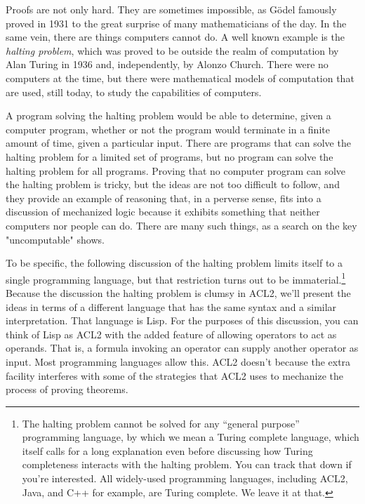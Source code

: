 Proofs are not only hard.
They are sometimes impossible, as G\"odel famously proved in 1931
to the great surprise of many mathematicians of the day.
In the same vein, there are things computers cannot do.
A well known example is the \emph{halting problem}, which
was proved to be outside the realm of computation
by Alan Turing in 1936
and, independently, by Alonzo Church.
There were no computers at the time,
but there were mathematical models of computation
that are used, still today, to study the capabilities of computers.

A program solving the
halting problem would be able to determine,
given a computer program, whether or not the program would terminate
in a finite amount of time, given a particular input.
There are programs that can solve the halting problem for
a limited set of programs,
but no program can solve the halting problem for all programs.
Proving that no computer program can solve the halting problem is tricky,
but the ideas are not too difficult to follow, and
they provide an example of reasoning that,
in a perverse sense, fits into a discussion of mechanized logic
because it exhibits something that neither computers
nor people can do. There are many such things, as a search
on the key "uncomputable" shows.

To be specific, the following discussion of the halting problem
limits itself to a single programming language, but
that restriction turns out to be immaterial.\footnote{The
halting problem cannot be solved
for any ``general purpose'' programming language,
by which we mean a Turing complete language,
which itself calls for a long explanation even
before discussing how Turing completeness
interacts with the halting problem.
You can track that down if you're interested.
All widely-used programming languages,
including ACL2, Java, and C++ for example, are Turing complete.
We leave it at that.}
Because the discussion the halting problem is clumsy in ACL2,
we'll present the ideas in terms of a different
language that has the same syntax
and a similar interpretation. That language is Lisp.
For the purposes of this discussion,
you can think of Lisp as ACL2 with the added feature
of allowing operators to act as operands.
That is, a formula invoking an operator can supply
another operator as input.
Most programming languages allow this.
ACL2 doesn't because the extra facility
interferes with some of the strategies that ACL2 uses
to mechanize the process of proving theorems.

